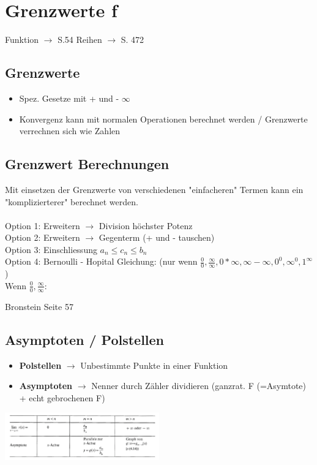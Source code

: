\documentclass{article}
\begin{document}
		\section{Grenzwerte f}
		Funktion $\rightarrow$ S.54
		Reihen $\rightarrow$ S. 472
	\subsection{Grenzwerte}
	\begin{itemize}
		\item Spez. Gesetze mit + und - $\infty$
		\item Konvergenz kann mit normalen Operationen berechnet werden / Grenzwerte verrechnen sich wie Zahlen
	\end{itemize}
	\subsection{Grenzwert Berechnungen}
	Mit einsetzen der Grenzwerte von verschiedenen "einfacheren" Termen kann ein "komplizierterer" berechnet werden. \\ \\
	Option 1: Erweitern $\rightarrow$ Division höchster Potenz \\
	Option 2: Erweitern $\rightarrow$ Gegenterm (+ und - tauschen) \\
	Option 3: Einschliessung $a_n \leq c_n \leq b_n$ \\
	Option 4: Bernoulli - Hopital Gleichung: (nur wenn $\frac{0}{0}, \frac{\infty}{\infty}, 0 * \infty, \infty - \infty, 0^0,\infty^0, 1^\infty$) \\
	Wenn  $\frac{0}{0}, \frac{\infty}{\infty}$: 
    \begin{center}
    Bronstein Seite 57
    \end{center}
	\subsection{Asymptoten / Polstellen}
	\begin{itemize}
	    \item \textbf{Polstellen} $\rightarrow$ Unbestimmte Punkte in einer Funktion
	    \item \textbf{Asymptoten} $\rightarrow$ Nenner durch Zähler dividieren (ganzrat. F (=Asymtote) + echt gebrochenen F)
	\end{itemize}
	\begin{center}
	    \includegraphics[width=0.5\textwidth]{Asymptote.jpg}
	\end{center}
\end{document}
